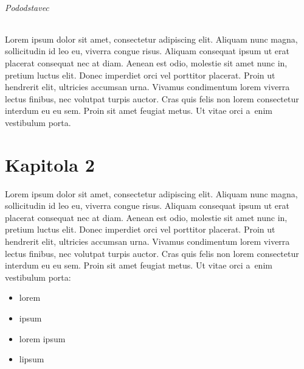 \subparagraph{Pododstavec}
Lorem ipsum dolor sit amet, consectetur adipiscing elit.
Aliquam nunc magna, sollicitudin id leo eu, viverra congue risus.
Aliquam consequat ipsum ut erat placerat consequat nec at diam. 
Aenean est odio, molestie sit amet nunc in, pretium luctus elit. 
Donec imperdiet orci vel porttitor placerat. 
Proin ut hendrerit elit, ultricies accumsan urna. 
Vivamus condimentum lorem viverra lectus finibus, nec volutpat turpis auctor.
Cras quis felis non lorem consectetur interdum eu eu sem. 
Proin sit amet feugiat metus. 
Ut vitae orci a~enim vestibulum porta. 

\chapter{Kapitola 2}
Lorem ipsum dolor sit amet, consectetur adipiscing elit.
Aliquam nunc magna, sollicitudin id leo eu, viverra congue risus.
Aliquam consequat ipsum ut erat placerat consequat nec at diam. 
Aenean est odio, molestie sit amet nunc in, pretium luctus elit. 
Donec imperdiet orci vel porttitor placerat. 
Proin ut hendrerit elit, ultricies accumsan urna. 
Vivamus condimentum lorem viverra lectus finibus, nec volutpat turpis auctor.
Cras quis felis non lorem consectetur interdum eu eu sem. 
Proin sit amet feugiat metus. 
Ut vitae orci a~enim vestibulum porta:
\begin{itemize} %
    \item lorem
    \item ipsum
    \item lorem ipsum
    \item lipsum
\end{itemize}

